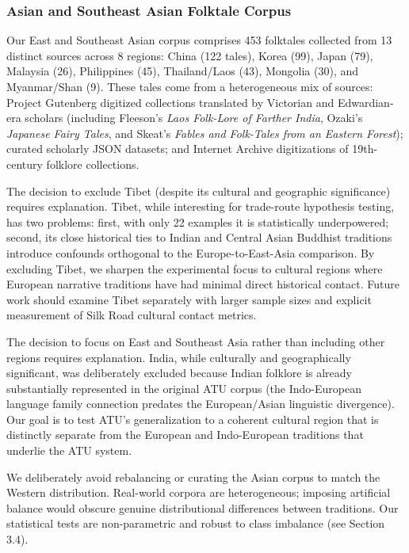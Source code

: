 \documentclass{article}
\begin{document}
\subsubsection{Asian and Southeast Asian Folktale Corpus}

Our East and Southeast Asian corpus comprises 453 folktales collected from 13 distinct sources across 8 regions: China (122 tales), Korea (99), Japan (79), Malaysia (26), Philippines (45), Thailand/Laos (43), Mongolia (30), and Myanmar/Shan (9). These tales come from a heterogeneous mix of sources: Project Gutenberg digitized collections translated by Victorian and Edwardian-era scholars (including Fleeson's \textit{Laos Folk-Lore of Farther India}, Ozaki's \textit{Japanese Fairy Tales}, and Skeat's \textit{Fables and Folk-Tales from an Eastern Forest}); curated scholarly JSON datasets; and Internet Archive digitizations of 19th-century folklore collections.

The decision to exclude Tibet (despite its cultural and geographic significance) requires explanation. Tibet, while interesting for trade-route hypothesis testing, has two problems: first, with only 22 examples it is statistically underpowered; second, its close historical ties to Indian and Central Asian Buddhist traditions introduce confounds orthogonal to the Europe-to-East-Asia comparison. By excluding Tibet, we sharpen the experimental focus to cultural regions where European narrative traditions have had minimal direct historical contact. Future work should examine Tibet separately with larger sample sizes and explicit measurement of Silk Road cultural contact metrics.

The decision to focus on East and Southeast Asia rather than including other regions requires explanation. India, while culturally and geographically significant, was deliberately excluded because Indian folklore is already substantially represented in the original ATU corpus (the Indo-European language family connection predates the European/Asian linguistic divergence). Our goal is to test ATU's generalization to a coherent cultural region that is distinctly separate from the European and Indo-European traditions that underlie the ATU system.

We deliberately avoid rebalancing or curating the Asian corpus to match the Western distribution. Real-world corpora are heterogeneous; imposing artificial balance would obscure genuine distributional differences between traditions. Our statistical tests are non-parametric and robust to class imbalance (see Section 3.4).
\end{document}
